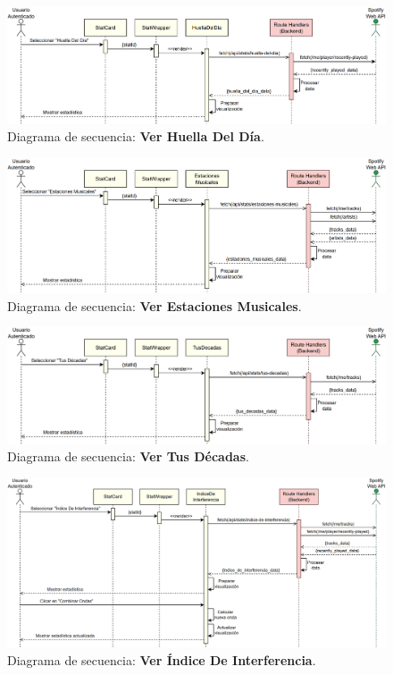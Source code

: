 \begin{figure}[H]
  \centering
  \includegraphics[width=\textwidth]{figures/diagramas_secuencia/ds_ver_huella_del_dia.png}
  \caption{Diagrama de secuencia: \textbf{Ver Huella Del Día}.}
  \label{fig:ds_ver_huella_del_dia}
\end{figure}

\begin{figure}[H]
  \centering
  \includegraphics[width=\textwidth]{figures/diagramas_secuencia/ds_ver_estaciones_musicales.png}
  \caption{Diagrama de secuencia: \textbf{Ver Estaciones Musicales}.}
  \label{fig:ds_ver_estaciones_musicales}
\end{figure}

\begin{figure}[H]
  \centering
  \includegraphics[width=\textwidth]{figures/diagramas_secuencia/ds_ver_tus_decadas.png}
  \caption{Diagrama de secuencia: \textbf{Ver Tus Décadas}.}
  \label{fig:ds_ver_tus_decadas}
\end{figure}

\begin{figure}[H]
  \centering
  \includegraphics[width=\textwidth]{figures/diagramas_secuencia/ds_ver_indice_de_interferencia.png}
  \caption{Diagrama de secuencia: \textbf{Ver Índice De Interferencia}.}
  \label{fig:ds_ver_indice_de_interferencia}
\end{figure}

